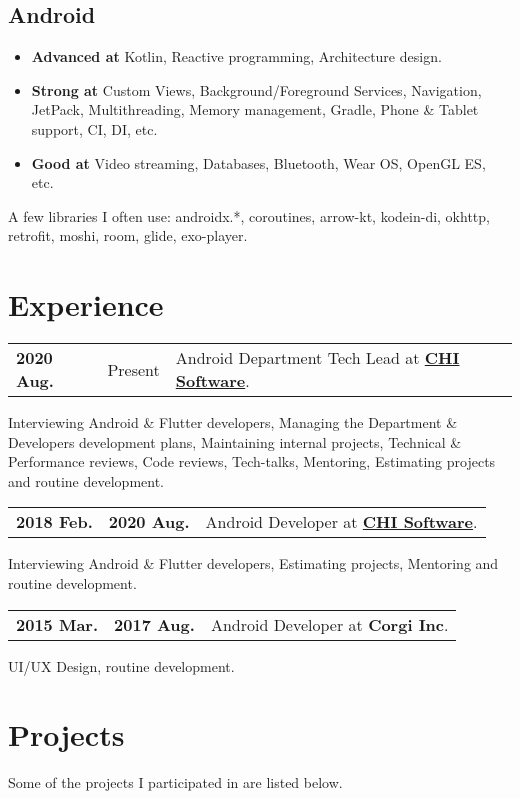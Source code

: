 \documentclass[a4paper]{article}
\begin{document}
	\subsection*{Android}
	\begin{multicols}{2}
	\begin{itemize}
		\item \textbf{Advanced at} Kotlin, Reactive programming, Architecture design.
		\item \textbf{Strong at} Custom Views, Background/Foreground Services, Navigation, JetPack, Multithreading, Memory management, Gradle, Phone \& Tablet support, CI, DI, etc.
		\item \textbf{Good at} Video streaming, Databases, Bluetooth, Wear OS, OpenGL ES, etc.
	\end{itemize}
	\end{multicols}
	
	{ \footnotesize
	A few libraries I often use: androidx.*, coroutines, arrow-kt, kodein-di, okhttp, retrofit, moshi, room, glide, exo-player.       
	}
	
	\section*{Experience}
	\begin{tabular}{@{}l@{\enspace--\enspace}ll}
		\textbf{2020 Aug.} & Present & Android Department Tech Lead at \href{https://chisw.com}{\textbf{CHI Software}}. \\
	\end{tabular}
	Interviewing Android & Flutter developers, Managing the Department & Developers development plans, Maintaining internal projects, Technical & Performance reviews, Code reviews, Tech-talks, Mentoring, Estimating projects and routine development.    
	\begin{tabular}{@{}l@{\enspace--\enspace}ll}
		\textbf{2018 Feb.} & \textbf{2020 Aug.} & Android Developer at \href{https://chisw.com}{\textbf{CHI Software}}. \\
	\end{tabular}
	Interviewing Android & Flutter developers, Estimating projects, Mentoring and routine development.    
	\begin{tabular}{@{}l@{\enspace--\enspace}ll}
		\textbf{2015 Mar.} & \textbf{2017 Aug.} & Android Developer at \textbf{Corgi Inc}. \\
	\end{tabular}
	UI/UX Design, routine development. 

	\section*{Projects}
	Some of the projects I participated in are listed below. 
\end{document}
